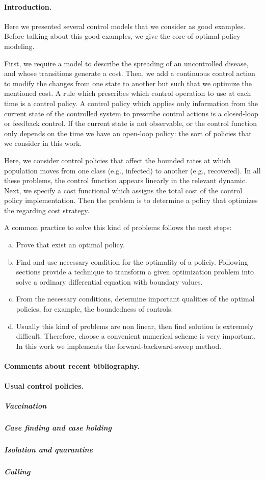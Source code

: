 
\paragraph{Introduction.} 
Here we presented several control models that we consider as good 
examples. Before talking about this good examples, we give the core of optimal 
policy modeling.

First, we require a model to describe the spreading of an uncontrolled disease,
and whose transitions generate a cost. Then, we add a continuous control action
to modify the changes from one state to another but such that we optimize the
mentioned cost. A rule which prescribes which control operation to use at each
time is a control policy. A control policy which applies only information from
the current state of the controlled system to prescribe control actions is a
closed-loop or feedback control. If the current state is not observable, or the
control function only depends on the time we have an open-loop policy: the sort
of policies that we consider in this work.

  Here, we consider control policies that affect the bounded rates at which
population moves from one class (e.g., infected) to another (e.g., recovered).
In all these problems, the control function appears linearly in the relevant
dynamic. Next, we specify a cost functional which assigns the total cost of the
control policy implementation. Then the problem is to determine a policy that
optimizes the regarding cost strategy.

  A common practice to solve this kind of problems follows the next steps:
  \begin{enumerate}[(a)]
    \item
      Prove that exist an optimal policy.
    \item 
      Find and use necessary condition for the optimality of a policiy.
      Following sections provide a technique to transform a given optimization
      problem into solve a ordinary differential equation with boundary values.
    \item 
      From the necessary conditions, determine important qualities of the 
      optimal policies, for example, the boundedness of controls.
    \item 
      Usually this kind of problems are non linear, then find solution is 
      extremely difficult. Therefore, choose a convenient numerical scheme is
      very important. In this work we implements the forward-backward-sweep 
      method.
  \end{enumerate}
\paragraph{Comments about recent bibliography.}

\paragraph{Usual control policies.}
  \subparagraph{Vaccination}
  \subparagraph{Case finding and case holding}
  \subparagraph{Isolation and quarantine}
  \subparagraph{Culling}